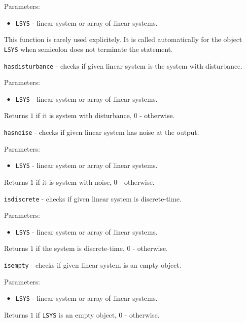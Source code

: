 Parameters:
\begin{itemize}
\item {\tt LSYS} - linear system or array of linear systems.
\end{itemize}
This function is rarely used explicitely. It is called automatically
for the object {\tt LSYS} when semicolon does not terminate the statement.

\newpage

{\Large {\tt hasdisturbance}} - checks if given linear system is the system
with disturbance.

Parameters:
\begin{itemize}
\item {\tt LSYS} - linear system or array of linear systems.
\end{itemize}

Returns $1$ if it is system with disturbance, $0$ - otherwise.

\newpage

{\Large {\tt hasnoise}} - checks if given linear system has noise at the
output.

Parameters:
\begin{itemize}
\item {\tt LSYS} - linear system or array of linear systems.
\end{itemize}

Returns $1$ if it is system with noise, $0$ - otherwise.

\newpage

{\Large {\tt isdiscrete}} - checks if given linear system is discrete-time.

Parameters:
\begin{itemize}
\item {\tt LSYS} - linear system or array of linear systems.
\end{itemize}

Returns $1$ if the system is discrete-time, $0$ - otherwise.

\newpage

{\Large {\tt isempty}} - checks if given linear system is an empty object.

Parameters:
\begin{itemize}
\item {\tt LSYS} - linear system or array of linear systems.
\end{itemize}

Returns $1$ if {\tt LSYS} is an empty object, $0$ - otherwise.

\newpage

